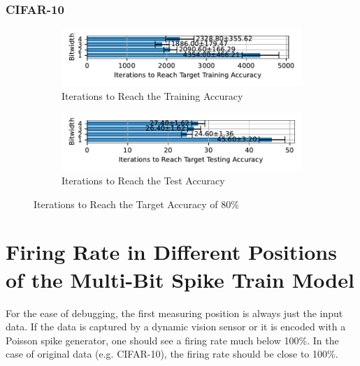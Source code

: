     \subsection{CIFAR-10}
    \label{appendix:iterations_cifar10}
        \begin{figure}[H]
            \centering
            \begin{subfigure}[H]{0.6\textwidth}
                \centering
                \includegraphics[width=\textwidth]{../standard/CIFAR10/plots/cifar10_train_iters_horizontal.pdf}
                \caption{Iterations to Reach the Training Accuracy}
            \end{subfigure}
            \hfill
            \begin{subfigure}[H]{0.6\textwidth}
                \centering
                \includegraphics[width=\textwidth]{../standard/CIFAR10/plots/cifar10_test_iters_horizontal.pdf}
                \caption{Iterations to Reach the Test Accuracy}
            \end{subfigure}
            \caption{Iterations to Reach the Target Accuracy of 80\%}
        \end{figure}



\chapter{Firing Rate in Different Positions of the Multi-Bit Spike Train Model}
\label{appendix:firerate}

    For the ease of debugging, the first measuring position is always just the input data. If the data is captured by a dynamic vision sensor or it is encoded with a Poisson spike generator, one should see a firing rate much below 100\%. In the case of original data (e.g. CIFAR-10), the firing rate should be close to 100\%. 

